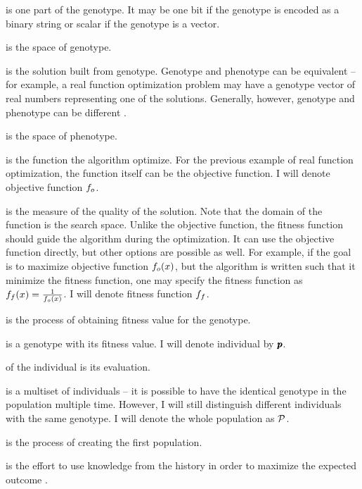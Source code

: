  is one part of the genotype. It may be one bit if the genotype is encoded as a binary string or scalar if the genotype is a vector. 

 is the space of genotype.

 is the solution built from genotype. Genotype and phenotype can be equivalent -- for example, a real function optimization problem may have a genotype vector of real numbers representing one of the solutions. Generally, however, genotype and phenotype can be different \citep{GeneticAlgorithmEssentials}.

 is the space of phenotype.

 is the function the algorithm optimize. For the previous example of real function optimization, the function itself can be the objective function. I will denote objective function $f_o$.

 is the measure of the quality of the solution. Note that the domain of the function is the search space. Unlike the objective function, the fitness function should guide the algorithm during the optimization. It can use the objective function directly, but other options are possible as well. For example, if the goal is to maximize objective function $f_o(x)$, but the algorithm is written such that it minimize the fitness function, one may specify the fitness function as $f_f(x)=\frac{1}{f_o(x)}$. I will denote fitness function $f_f$.

 is the process of obtaining fitness value for the genotype.

 is a genotype with its fitness value. I will denote individual by $\pmb{p}$.

 of the individual is its evaluation. 

 is a multiset of individuals -- it is possible to have the identical genotype in the population multiple time. However, I will still distinguish different individuals with the same genotype. I will denote the whole population as $\mathcal{P}$.

 is the process of creating the first population.

 is the effort to use knowledge from the history in order to maximize the expected outcome \citep{SelfAdaptiveFeaturesInRealParameterEvolutionaryAlgorithms}.

